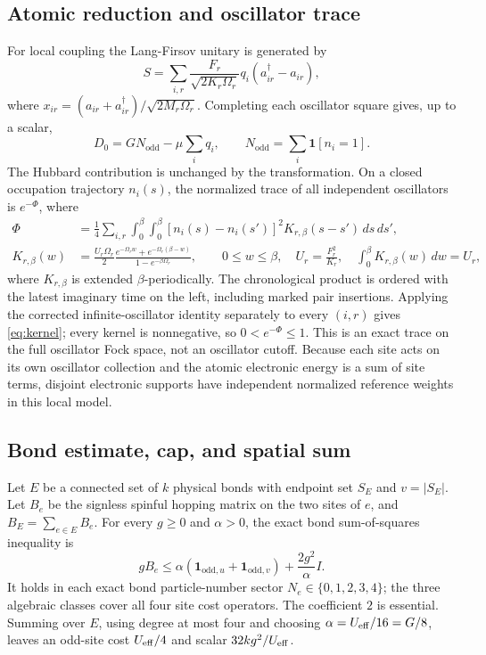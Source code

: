 \documentclass[11pt]{article}
\newcommand{\Nodd}{N_{\mathrm{odd}}}
\begin{document}
\subsection{Atomic reduction and oscillator trace}
For local coupling the Lang-Firsov unitary is generated by
\[
 S=\sum_{i,r}\frac{F_r}{\sqrt{2K_r\Omega_r}}q_i(a_{ir}^\dagger-a_{ir}),
\]
where $x_{ir}=(a_{ir}+a_{ir}^\dagger)/\sqrt{2M_r\Omega_r}$. Completing each oscillator square gives, up to a scalar,
\[
 D_0=G\Nodd-\mu\sum_iq_i,\qquad
 \Nodd=\sum_i\mathbf 1[n_i=1].
\]
The Hubbard contribution is unchanged by the transformation. On a closed occupation trajectory $n_i(s)$, the normalized trace of all independent oscillators is $e^{-\Phi}$, where
\begin{align}
\Phi&=\frac14\sum_{i,r}\int_0^\beta\!\int_0^\beta
[n_i(s)-n_i(s')]^2K_{r,\beta}(s-s')\,ds\,ds',\\
K_{r,\beta}(w)&=\frac{U_r\Omega_r}{2}
\frac{e^{-\Omega_rw}+e^{-\Omega_r(\beta-w)}}{1-e^{-\beta\Omega_r}},\qquad
0\le w\le\beta,\quad U_r=\frac{F_r^2}{K_r},\quad \int_0^\beta K_{r,\beta}(w)\,dw=U_r,
\label{eq:kernel}
\end{align}
where $K_{r,\beta}$ is extended $\beta$-periodically.
The chronological product is ordered with the latest imaginary time on the left, including marked pair insertions. Applying the corrected infinite-oscillator identity separately to every $(i,r)$ gives \eqref{eq:kernel}; every kernel is nonnegative, so $0<e^{-\Phi}\le1$. This is an exact trace on the full oscillator Fock space, not an oscillator cutoff. Because each site acts on its own oscillator collection and the atomic electronic energy is a sum of site terms, disjoint electronic supports have independent normalized reference weights in this local model.

\subsection{Bond estimate, cap, and spatial sum}
Let $E$ be a connected set of $k$ physical bonds with endpoint set $S_E$ and $v=|S_E|$. Let $B_e$ be the signless spinful hopping matrix on the two sites of $e$, and $B_E=\sum_{e\in E}B_e$. For every $g\ge0$ and $\alpha>0$, the exact bond sum-of-squares inequality is
\[
 gB_e\le\alpha(\mathbf 1_{\mathrm{odd},u}+\mathbf 1_{\mathrm{odd},v})+
 \frac{2g^2}{\alpha}I .
\]
It holds in each exact bond particle-number sector $N_e\in\{0,1,2,3,4\}$; the three algebraic classes cover all four site cost operators. The coefficient $2$ is essential. Summing over $E$, using degree at most four and choosing $\alpha=U_{\rm eff}/16=G/8$, leaves an odd-site cost $U_{\rm eff}/4$ and scalar $32kg^2/U_{\rm eff}$.
\end{document}
